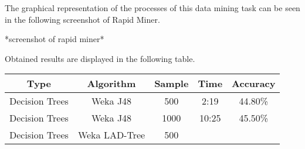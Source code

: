 The graphical representation of the processes of this data mining task can be seen in the following screenshot of Rapid Miner.

*screenshot of rapid miner*

Obtained results are displayed in the following table.

\begin{tabular}{|c|c|c|c|c|}
\hline
Type     &       Algorithm   & Sample &  Time &  Accuracy   \\
\hline
\hline
Decision Trees &  Weka J48    &  500  &   2:19 &    44.80\%  \\
Decision Trees & Weka J48    & 1000  &  10:25 &    45.50\%  \\
Decision Trees & Weka LAD-Tree &  500  &        &           \\
\hline
\end{tabular}




